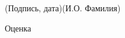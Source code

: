 \documentclass[14pt, russian]{scrartcl}
\begin{document}
\begin{titlepage}
\vspace{-2ex}
\noindent\hspace{13.5ex}\normalsize\hspace{170pt}\hspace{2ex}\scriptsize{(Подпись, дата)}\normalsize\hspace{30pt}\hspace{6ex}\scriptsize{(И.О. Фамилия)}\normalsize
\bigskip

\noindent Оценка \hfill \underline{\hspace{7.0cm}}

\vspace{-2ex}
\noindent\hspace{13.5ex}
\bigskip
\vfill












\end{titlepage}
\end{document}

